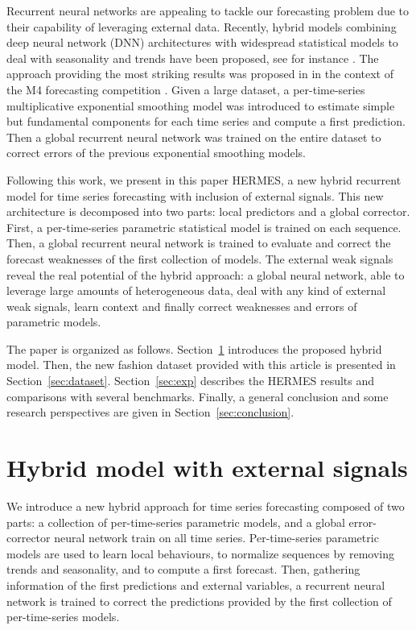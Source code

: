 \documentclass[lettersize,journal]{IEEEtran}
\begin{document}
Recurrent neural networks are appealing to tackle our forecasting problem due to their capability of leveraging external data.  Recently, hybrid models combining deep neural network (DNN) architectures with widespread statistical models to deal with seasonality and trends have been proposed, see for instance  \cite{zhang2003time,jianwei2019novel,bandara2020lstm}. The approach providing the most striking results was proposed in  \cite{smyl2020hybrid} in the context of the M4 forecasting competition \cite{makridakis2020m4}.  Given a large dataset, a per-time-series multiplicative exponential smoothing model was introduced to estimate simple but fundamental components for each time series and compute a first prediction. Then a global recurrent neural network was trained on the entire dataset to correct errors of the previous exponential smoothing models. 

Following this work, we present in this paper HERMES, a new hybrid recurrent model for time series forecasting with inclusion of external signals. This new architecture is decomposed  into two parts: local predictors and a global corrector.  First, a per-time-series parametric statistical model is trained on each sequence. Then, a global recurrent neural network is trained to evaluate and correct the forecast weaknesses of the first collection of models. The external weak signals reveal the real potential of the hybrid approach: a global neural network, able to leverage large amounts of heterogeneous data, deal with any kind of external weak signals, learn context and finally correct weaknesses and errors of parametric models.

The paper is organized as follows. Section~\ref{sec:hybrid} introduces the proposed hybrid model. Then, the new fashion dataset provided with this article is presented in Section~\ref{sec:dataset}. Section~\ref{sec:exp} describes the HERMES results and comparisons with several benchmarks. Finally, a general conclusion and some research perspectives are given in  Section~\ref{sec:conclusion}.

\section{Hybrid model with external signals}
\label{sec:hybrid}
We introduce a new hybrid approach for time series forecasting  composed of two parts: a collection of per-time-series parametric models, and a global error-corrector neural network train on all time series. Per-time-series parametric models are used to learn local behaviours, to normalize sequences by removing trends and seasonality,  and to compute a first forecast. Then, gathering information of the first predictions and external variables, a recurrent neural network is trained to correct the predictions provided by the first collection of per-time-series models.
\end{document}
